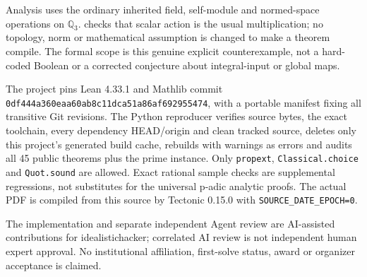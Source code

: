 \documentclass[10pt,a4paper]{article}
\newcommand{\Q}{\mathbb Q}
\begin{document}
Analysis uses the ordinary inherited field, self-module and normed-space operations on
$\Q_3$.  checks that scalar action is the usual multiplication;
no topology, norm or mathematical assumption is changed to make a theorem compile.
The formal scope is this genuine explicit counterexample, not a hard-coded Boolean or
a corrected conjecture about integral-input or global maps.

The project pins Lean 4.33.1 and Mathlib commit
\texttt{0df444a360eaa60ab8c11dca51a86af692955474}, with a portable manifest fixing all
transitive Git revisions. The Python reproducer verifies source bytes, the exact toolchain,
every dependency HEAD/origin and clean tracked source, deletes only this project's generated
build cache, rebuilds with warnings as errors and audits all 45 public theorems plus the prime
instance. Only \texttt{propext}, \texttt{Classical.choice} and \texttt{Quot.sound} are allowed.
Exact rational sample checks are supplemental regressions, not substitutes for the universal
p-adic analytic proofs. The actual PDF is compiled from this source by Tectonic 0.15.0 with
\texttt{SOURCE\_DATE\_EPOCH=0}.

The implementation and separate independent Agent review are AI-assisted contributions for
idealistichacker; correlated AI review is not independent human expert approval. No
institutional affiliation, first-solve status, award or organizer acceptance is claimed.
\end{document}
